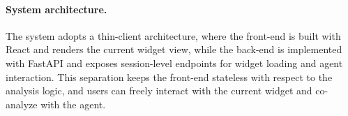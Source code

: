 \paragraph{System architecture.}
The system adopts a thin-client architecture, where the front-end is built with React and renders the current widget view, while the back-end is implemented with FastAPI and exposes session-level endpoints for widget loading and agent interaction.
This separation keeps the front-end stateless with respect to the analysis logic, and users can freely interact with the current widget and co-analyze with the agent.


